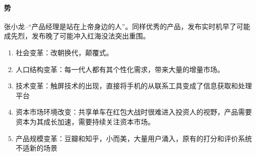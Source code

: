 \documentclass[letterpaper,11pt,english]{sphinxmanual}
\begin{document}
\paragraph{势}
\label{\detokenize{chapter_introduction/ability:id4}}
张小龙–“产品经理是站在上帝身边的人”。同样优秀的产品，发布实时机早了可能成先烈，发布晚了可能冲入红海没法突出重围。
\begin{enumerate}
%
\item {} 
社会变革：改朝换代，颠覆式。

\item {} 
人口结构变革：每一代人都有其个性化需求，带来大量的增量市场。

\item {} 
技术变革：触屏技术的出现，直接将手机的从联系工具变成了信息获取和处理平台

\item {} 
资本市场环境改变：共享单车在红包大战时很难进入投资人的视野，产品需要资本为其成长加速，需要持续关注资本市场。

\item {} 
产品规模变革：豆瓣和知乎，小而美，大量用户涌入，原有的打分和评价系统不适新的场景

\end{enumerate}
\end{document}
